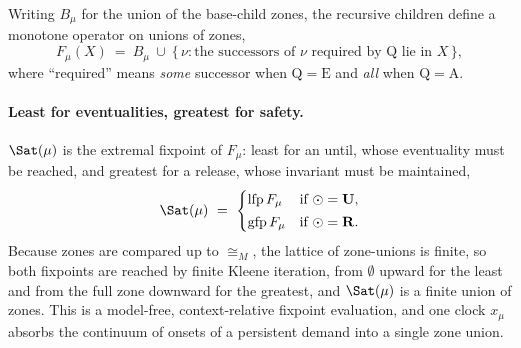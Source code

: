 Writing $B_\mu$ for the union of the base-child zones, the recursive children define a monotone operator on
unions of zones,
\[
F_\mu(X)\ =\ B_\mu\ \cup\ \{\,\nu : \text{the successors of $\nu$ required by $\mathrm{Q}$ lie in $X$}\,\},
\]
where ``required'' means \emph{some} successor when $\mathrm{Q}=\mathrm{E}$ and \emph{all} when
$\mathrm{Q}=\mathrm{A}$.

\paragraph{Least for eventualities, greatest for safety.}
$\Sat(\mu)$ is the extremal fixpoint of $F_\mu$: least for an until, whose eventuality must be reached, and
greatest for a release, whose invariant must be maintained,
\[
\Sat(\mu)\ =\
\begin{cases}
\mathrm{lfp}\,F_\mu & \text{if } \odot=\mathbf{U},\\[2pt]
\mathrm{gfp}\,F_\mu & \text{if } \odot=\mathbf{R}.
\end{cases}
\]
Because zones are compared up to $\cong_M$, the lattice of zone-unions is finite, so both fixpoints are
reached by finite Kleene iteration, from $\emptyset$ upward for the least and from the full zone downward
for the greatest, and $\Sat(\mu)$ is a finite union of zones. This is a model-free, context-relative
fixpoint evaluation, and one clock $x_\mu$ absorbs the continuum of onsets of a persistent demand into a
single zone union.

